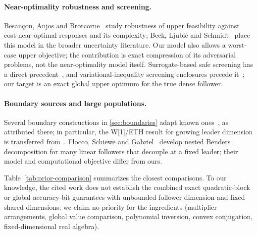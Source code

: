\paragraph{Near-optimality robustness and screening.}
Besan\c{c}on, Anjos and Brotcorne~\cite{BesanconAnjosBrotcorne2024,BesanconAnjosBrotcorne2021}
study robustness of upper feasibility against cost-near-optimal responses
and its complexity; Beck, Ljubi\'c and Schmidt~\cite{BeckLjubicSchmidt2023}
place this model in the broader uncertainty literature. Our model also
allows a worst-case upper objective; the contribution is exact compression
of its adversarial problems, not the near-optimality model itself.
Surrogate-based safe screening has a direct
precedent~\cite{DantasGribonval2019}, and variational-inequality screening
enclosures precede it~\cite{LiuZhaoWangYe2014}; our target is an exact
global upper optimum for the true dense follower.

\paragraph{Boundary sources and large populations.}
Several boundary constructions in \cref{sec:boundaries} adapt known
ones~\cite{SugishitaCarvalho2026,MairalYu2012,FroeseEtAl2026,GartnerEtAl2013,PardalosVavasis1991},
as attributed there; in particular, the W[1]/ETH result for growing leader
dimension is transferred from~\cite{FroeseEtAl2026}. Flocco, Schiewe and
Gabriel~\cite{FloccoEtAl2026} develop nested Benders decomposition for many
linear followers that decouple at a fixed leader; their model and
computational objective differ from ours.

Table~\ref{tab:prior-comparison} summarizes the closest comparisons. To our
knowledge, the cited work does not establish the combined exact
quadratic-block or global accuracy-bit guarantees with unbounded follower
dimension and fixed shared dimensions; we claim no priority for the
ingredients (multiplier arrangements, global value comparison, polynomial
inversion, convex conjugation, fixed-dimensional real algebra).

